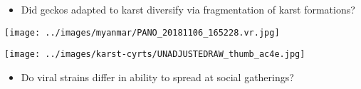 \begin{frame}[t]


    \begin{minipage}[t][0.92\headlessframetextheight][t]{\textwidth}
        \begin{minipage}[t][0.9\headlessframetextheight][t]{0.54\textwidth}
            \begin{itemize}
                \item<1-> Did geckos adapted to karst diversify via fragmentation of karst formations?
            \end{itemize}
            \begin{center}
                \texttt{[image: ../images/myanmar/PANO\_20181106\_165228.vr.jpg]}

                \smallskip
                \texttt{[image: ../images/karst-cyrts/UNADJUSTEDRAW\_thumb\_ac4e.jpg]}
            \end{center}
        \end{minipage}
        \begin{minipage}[t][0.9\headlessframetextheight][t]{0.45\textwidth}
            \begin{itemize}
                \item<2-> Do viral strains differ in ability to spread at social gatherings?
            \end{itemize}

            \vspace{1.4cm}
            \begin{center}
            \end{center}
        \end{minipage}

    \end{minipage}
    \begin{minipage}[t][0.08\headlessframetextheight][t]{\textwidth}
        \begin{center}
        \end{center}
    \end{minipage}

    \vspace{-5mm}
\end{frame}
